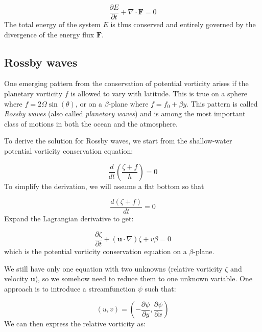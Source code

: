 \documentclass[12pt]{article}
\numberwithin{equation}{section}
\numberwithin{figure}{section}
\numberwithin{table}{section}
\begin{document}
\begin{equation}
  \frac{\partial E}{\partial t} + \nabla \cdot \mathbf{F} = 0
\end{equation}
The total energy of the system $E$ is thus conserved and entirely governed by
the divergence of the energy flux $\mathbf{F}$.

\subsection{Rossby waves}

One emerging pattern from the conservation of potential vorticity arises if
the planetary vorticity $f$ is allowed to vary with latitude.
This is true on a sphere where $f = 2 \Omega \sin(\theta)$, or on a $\beta$-plane
where $f = f_0 + \beta y$.
This pattern is called \textit{Rossby waves} (also called
\textit{planetary waves}) and is among the most important
class of motions in both the ocean and the atmosphere.

To derive the solution for Rossby waves, we start from the shallow-water potential
vorticity conservation equation:

\begin{equation}
  \frac{d}{dt} \left( \frac{\zeta + f}{h} \right) = 0
\end{equation}
To simplify the derivation, we will assume a flat bottom so that

\begin{equation}
  \frac{d(\zeta + f)}{dt} = 0
\end{equation}
Expand the Lagrangian derivative to get:

\begin{equation}
  \frac{\partial \zeta}{\partial t} + \left(\mathbf{u} \cdot \nabla \right) \zeta + v \beta = 0
  \label{eq:swe_potential_vorticity_beta}
\end{equation}
which is the potential vorticity conservation equation on a $\beta$-plane.

We still have only one equation with two unknowns (relative vorticity $\zeta$
and velocity $\mathbf{u}$), so we somehow need to reduce them to one unknown
variable.
One approach is to introduce a streamfunction $\psi$ such that:

\begin{equation}
  (u, v) = \left( - \frac{\partial \psi}{\partial y}, \frac{\partial \psi}{\partial x} \right)
  \label{eq:swe_streamfunction}
\end{equation}
We can then express the relative vorticity as:
\end{document}
